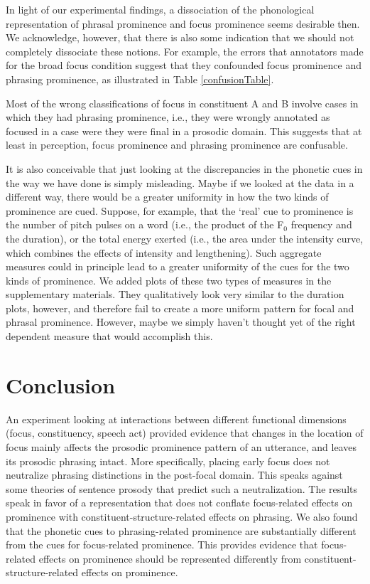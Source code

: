 \documentclass[preprint,review,12pt,authoryear,times]{elsarticle}
\begin{document}
In light of our experimental findings, a dissociation of the phonological representation of phrasal prominence and focus prominence seems desirable then. We acknowledge, however, that there is also some indication that we should not completely dissociate these notions. For example, the errors that annotators made for the broad focus condition suggest that they confounded focus prominence and phrasing prominence, as illustrated in Table \ref{confusionTable}.

 

Most of the wrong classifications of focus in constituent A and B involve cases in which they had phrasing prominence, i.e., they were wrongly annotated as focused in a case were they were final in a prosodic domain. This suggests that at least in perception, focus prominence and phrasing prominence are confusable. 

It is also conceivable that just looking at the discrepancies in the phonetic cues in the way we have done is simply misleading. Maybe if we looked at the data in a different way, there would be a greater uniformity in how the two kinds of prominence are cued. Suppose, for example, that the `real' cue to prominence is the number of pitch pulses on a word (i.e., the product of the F$_0$  frequency and the duration), or the total energy exerted (i.e., the area under the intensity curve, which combines the effects of intensity and lengthening). Such aggregate measures could in principle lead to a greater uniformity of the cues for the two kinds of prominence. We added plots of these two types of measures in the supplementary materials. They qualitatively look very similar to the duration plots, however, and therefore fail to create a more uniform pattern for focal and phrasal prominence. However, maybe we simply haven't thought yet of the right dependent measure that would accomplish this.  

\section{Conclusion}

An experiment looking at interactions between different functional dimensions (focus, constituency, speech act) provided evidence that changes in the location of focus mainly affects the prosodic prominence pattern of an utterance, and leaves its prosodic phrasing intact. More specifically, placing early focus does not neutralize phrasing distinctions in the post-focal domain. This speaks against some theories of sentence prosody that predict such a neutralization. The results speak in favor of a representation that does not conflate focus-related effects on prominence with constituent-structure-related effects on phrasing. We also found that the phonetic cues to phrasing-related prominence are substantially different from the cues for focus-related prominence. This provides evidence that focus-related effects on prominence should be represented differently from constituent-structure-related effects on prominence. 
\end{document}
